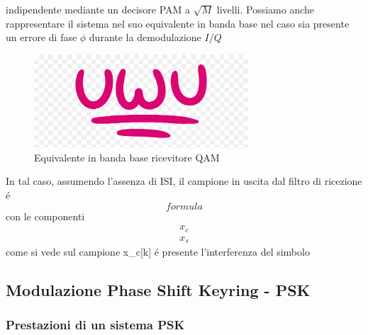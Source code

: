         indipendente mediante un decisore PAM a $\sqrt{M}$ livelli. Possiamo anche rappresentare il sistema nel suo
        equivalente in banda base nel caso sia presente un errore di fase $\phi$ durante la demodulazione $I/Q$
        \begin{figure}[H]
            \centering
            \includegraphics*[width = 8cm]{media/uwu.png}
            \caption{Equivalente in banda base ricevitore QAM}
        \end{figure}
        In tal caso, assumendo l'assenza di ISI, il campione in uscita dal filtro di ricezione é 
        \[
            formula  
        \]
        con le componenti 
        \begin{gather}
            x_c\nonumber \\
            x_s\nonumber
        \end{gather}
	come si vede sul campione x_{c[k]} é presente l'interferenza del simbolo 
        
    \subsection{Modulazione Phase Shift Keyring - PSK}
        \subsubsection{Prestazioni di un sistema PSK}
    
